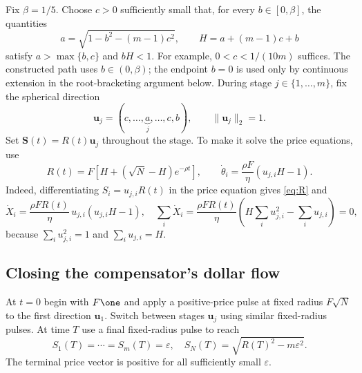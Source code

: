 \documentclass[review,hidelinks,onefignum,onetabnum]{siamonline250211}
\begin{document}
Fix $\beta=1/5$. Choose $c>0$ sufficiently small that, for every $b\in[0,\beta]$, the quantities
\begin{equation}\label{eq:abcs}
a=\sqrt{1-b^2-(m-1)c^2},\qquad H=a+(m-1)c+b
\end{equation}
satisfy $a>\max\{b,c\}$ and $bH<1$. For example, $0<c<1/(10m)$ suffices. The constructed path uses $b\in(0,\beta)$; the endpoint $b=0$ is used only by continuous extension in the root-bracketing argument below. During stage $j\in\{1,\dots,m\}$, fix the spherical direction
\begin{equation}\label{eq:uj}
\bm u_j=(c,\ldots,\underbrace{a}_{j},\ldots,c,b),
\qquad \|\bm u_j\|_2=1.
\end{equation}
Set $\bm S(t)=R(t)\bm u_j$ throughout the stage. To make it solve the price equations, use
\begin{equation}\label{eq:R}
R(t)=F\left[H+(\sqrt N-H)e^{-\rho t}\right],
\qquad
\dot\theta_i=\frac{\rho F}{\eta}\left(u_{j,i}H-1\right).
\end{equation}
Indeed, differentiating $S_i=u_{j,i}R(t)$ in the price equation gives \eqref{eq:R} and
\begin{equation}\label{eq:dXdt}
\dot X_i=\frac{\rho FR(t)}\eta\,u_{j,i}(u_{j,i}H-1),
\quad \sum_i\dot X_i=\frac{\rho FR(t)}\eta\left(H\sum_i u_{j,i}^2-\sum_i u_{j,i}\right)=0,
\end{equation}
because $\sum_i u_{j,i}^2=1$ and $\sum_i u_{j,i}=H$.

\subsection{Closing the compensator's dollar flow}
At $t=0$ begin with $F\one$ and apply a positive-price pulse at fixed radius $F\sqrt N$ to the first direction $\bm u_1$. Switch between stages $\bm u_j$ using similar fixed-radius pulses. At time $T$ use a final fixed-radius pulse to reach
\begin{equation}\label{eq:endpoint-severe}
S_1(T)=\cdots=S_m(T)=\varepsilon,
\quad S_N(T)=\sqrt{R(T)^2-m\varepsilon^2}.
\end{equation}
The terminal price vector is positive for all sufficiently small $\varepsilon$.
\end{document}
